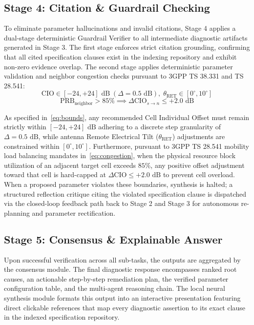 \documentclass[conference]{IEEEtran}
\begin{document}
\subsection{Stage 4: Citation \& Guardrail Checking}
To eliminate parameter hallucinations and invalid citations, Stage 4 applies a dual-stage deterministic Guardrail Verifier to all intermediate diagnostic artifacts generated in Stage 3. The first stage enforces strict citation grounding, confirming that all cited specification clauses exist in the indexing repository and exhibit non-zero evidence overlap. The second stage applies deterministic parameter validation and neighbor congestion checks pursuant to 3GPP TS 38.331 and TS 28.541:
\begin{equation}
\text{CIO} \in [-24, +24]\text{ dB}\; (\Delta = 0.5\text{ dB}), \; \theta_{\text{RET}} \in [0^\circ, 10^\circ]
\label{eq:bounds}
\end{equation}
\begin{equation}
\text{PRB}_{\text{neighbor}} > 85\% \implies \Delta\text{CIO}_{s \to n} \le +2.0\text{ dB}
\label{eq:congestion}
\end{equation}

As specified in~\eqref{eq:bounds}, any recommended Cell Individual Offset must remain strictly within $[-24, +24]\text{ dB}$ adhering to a discrete step granularity of $\Delta = 0.5\text{ dB}$, while antenna Remote Electrical Tilt ($\theta_{\text{RET}}$) adjustments are constrained within $[0^\circ, 10^\circ]$. Furthermore, pursuant to 3GPP TS 28.541 mobility load balancing mandates in~\eqref{eq:congestion}, when the physical resource block utilization of an adjacent target cell exceeds $85\%$, any positive offset adjustment toward that cell is hard-capped at $\Delta\text{CIO} \le +2.0\text{ dB}$ to prevent cell overload. When a proposed parameter violates these boundaries, synthesis is halted; a structured reflection critique citing the violated specification clause is dispatched via the closed-loop feedback path back to Stage 2 and Stage 3 for autonomous re-planning and parameter rectification.

\subsection{Stage 5: Consensus \& Explainable Answer}
Upon successful verification across all sub-tasks, the outputs are aggregated by the consensus module. The final diagnostic response encompasses ranked root causes, an actionable step-by-step remediation plan, the verified parameter configuration table, and the multi-agent reasoning chain. The local neural synthesis module formats this output into an interactive presentation featuring direct clickable references that map every diagnostic assertion to its exact clause in the indexed specification repository.
\end{document}
